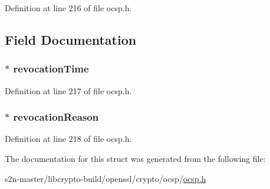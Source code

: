 Definition at line 216 of file ocsp.\+h.



\subsection{Field Documentation}
\subsubsection[{\texorpdfstring{revocation\+Time}{revocationTime}}]{ $\ast$ revocation\+Time}\hypertarget{structocsp__revoked__info__st_afb1fd371babae90eb6b01876d0336fc4}{}\label{structocsp__revoked__info__st_afb1fd371babae90eb6b01876d0336fc4}


Definition at line 217 of file ocsp.\+h.

\subsubsection[{\texorpdfstring{revocation\+Reason}{revocationReason}}]{ $\ast$ revocation\+Reason}\hypertarget{structocsp__revoked__info__st_a668b236e63cfc1ec00f67bfa7eb2c3b9}{}\label{structocsp__revoked__info__st_a668b236e63cfc1ec00f67bfa7eb2c3b9}


Definition at line 218 of file ocsp.\+h.



The documentation for this struct was generated from the following file\+:\begin{DoxyCompactItemize}
\item 
s2n-\/master/libcrypto-\/build/openssl/crypto/ocsp/\hyperlink{crypto_2ocsp_2ocsp_8h}{ocsp.\+h}\end{DoxyCompactItemize}
